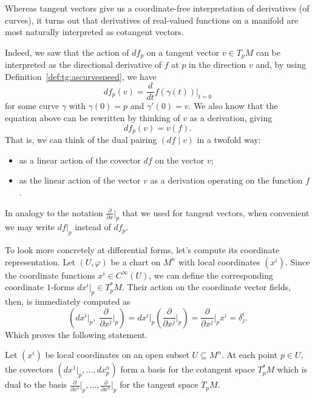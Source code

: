 Whereas tangent vectors give us a coordinate-free interpretation of derivatives (of curves), it turns out that derivatives of real-valued functions on a manifold are most naturally interpreted as cotangent vectors.

Indeed, we saw that the action of $df_p$ on a tangent vector $v\in T_p M$ can be interpreted as the directional derivative of $f$ at $p$ in the direction $v$ and, by using Definition~\ref{def:tg:ascurvespeed}, we have
\begin{equation}
  df_p(v) = \frac{d}{dt}f(\gamma(t))\Big|_{t=0}
\end{equation}
for some curve $\gamma$ with $\gamma(0) = p$ and $\gamma'(0)=v$.
We also know that the equation above can be rewritten by thinking of $v$ as a derivation, giving
\begin{equation}
  df_p(v) = v(f).
\end{equation}
That is, we can think of the dual pairing $(df\mid v)$ in a twofold way:
\begin{itemize}
  \item as a linear action of the covector $df$ on the vector $v$;
  \item as the linear action of the vector $v$ as a derivation operating on the function $f$.
\end{itemize}

\begin{notation}
  In analogy to the notation $\frac{\partial}{\partial x}\big|_p$ that we used for tangent vectors, when convenient we may write $df|_p$ instead of $df_p$.
\end{notation}

To look more concretely at differential forms, let's compute its coordinate representation.
Let $(U,\varphi)$ be a chart on $M^n$ with local coordinates $(x^i)$.
Since the coordinate functions $x^i\in C^\infty(U)$, we can define the corresponding coordinate $1$-forms $dx^i|_p \in T_p^* M$.
Their action on the coordinate vector fields, then, is immediately computed as
\begin{equation}
  \left(dx^i|_p ,\; \frac{\partial}{\partial x^j}\Big|_p\right) =
  dx^i|_p \left(\frac{\partial}{\partial x^j}\Big|_p\right)
  = \frac{\partial}{\partial x^j}\Big|_p x^i
  = \delta^i_j.
\end{equation}
Which proves the following statement.

\begin{proposition}
  Let $(x^i)$ be local coordinates on an open subset $U\subseteq M^n$.
  At each point $p\in U$, the covectors $(dx^1|_p, \ldots, dx^n_p)$ form a basis for the cotangent space $T_p^* M$ which is dual to the basis $\frac{\partial}{\partial x^1}\Big|_p, \ldots, \frac{\partial}{\partial x^n}\Big|_p$ for the tangent space $T_p M$.
\end{proposition}

